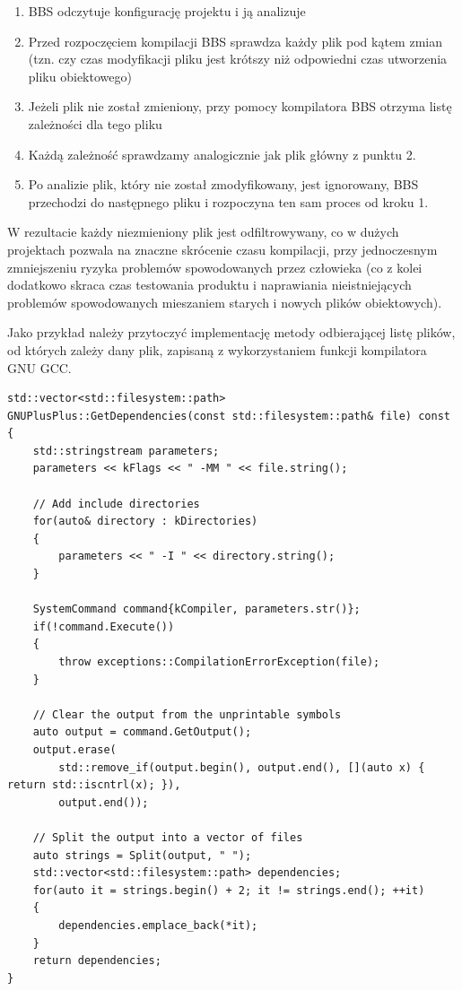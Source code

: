 \begin{enumerate}
    \item BBS odczytuje konfigurację projektu i ją analizuje
    \item Przed rozpoczęciem kompilacji BBS sprawdza każdy plik pod kątem zmian (tzn. czy czas modyfikacji pliku jest krótszy niż odpowiedni czas utworzenia pliku obiektowego)
    \item Jeżeli plik nie został zmieniony, przy pomocy kompilatora BBS otrzyma listę zależności dla tego pliku
    \item Każdą zależność sprawdzamy analogicznie jak plik główny z punktu 2.
    \item Po analizie plik, który nie został zmodyfikowany, jest ignorowany, BBS przechodzi do następnego pliku i rozpoczyna ten sam proces od kroku 1.
\end{enumerate}

W rezultacie każdy niezmieniony plik jest odfiltrowywany, co w dużych projektach pozwala na znaczne skrócenie czasu kompilacji, przy jednoczesnym zmniejszeniu ryzyka problemów spowodowanych przez człowieka (co z kolei dodatkowo skraca czas testowania produktu i naprawiania nieistniejących problemów spowodowanych mieszaniem starych i nowych plików obiektowych).

Jako przykład należy przytoczyć implementację metody odbierającej listę plików, od których zależy dany plik, zapisaną z wykorzystaniem funkcji kompilatora GNU GCC.

\begin{lstlisting}[label=list:dependencies,caption=Implementacja metody GNUPlusPlus::GetDependencies(),basicstyle=\footnotesize\ttfamily]
std::vector<std::filesystem::path>
GNUPlusPlus::GetDependencies(const std::filesystem::path& file) const
{
	std::stringstream parameters;
	parameters << kFlags << " -MM " << file.string();

	// Add include directories
	for(auto& directory : kDirectories)
	{
		parameters << " -I " << directory.string();
	}

	SystemCommand command{kCompiler, parameters.str()};
	if(!command.Execute())
	{
		throw exceptions::CompilationErrorException(file);
	}

	// Clear the output from the unprintable symbols
	auto output = command.GetOutput();
	output.erase(
		std::remove_if(output.begin(), output.end(), [](auto x) { return std::iscntrl(x); }),
		output.end());

	// Split the output into a vector of files
	auto strings = Split(output, " ");
	std::vector<std::filesystem::path> dependencies;
	for(auto it = strings.begin() + 2; it != strings.end(); ++it)
	{
		dependencies.emplace_back(*it);
	}
	return dependencies;
}
\end{lstlisting}

